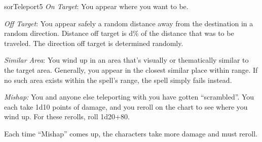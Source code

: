 \begin{spellcard}{sor}{Teleport}{5}
  \emph{On Target}: You appear where you want to be.

  \emph{Off Target}: You appear safely a random distance away from the
  destination in a random direction. Distance off target is d\% of the
  distance that was to be traveled. The direction off target is determined
  randomly.

  \emph{Similar Area}: You wind up in an area that's visually or
  thematically similar to the target area. Generally, you appear in the
  closest similar place within range. If no such area exists within the
  spell's range, the spell simply fails instead.

  \emph{Mishap:} You and anyone else teleporting with you have gotten
  ``scrambled''. You each take 1d10 points of damage, and you reroll on the
  chart to see where you wind up. For these rerolls, roll 1d20+80.

  Each time ``Mishap'' comes up, the characters take more damage and must
  reroll.

\end{spellcard}
